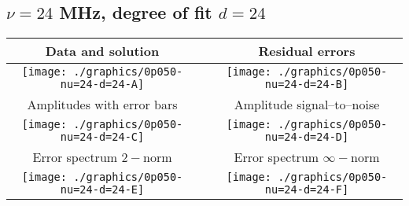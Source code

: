 

% 

\clearpage{}
\break{}

\subsection{$\nu = 24$ MHz, degree of fit $d = 24$}

\begin{table}[h]
    \begin{center}
        \begin{tabular}{ccc}
            Data and solution & \quad & Residual errors \\\hline
            \texttt{[image: ./graphics/0p050-nu=24-d=24-A]} &&
            \texttt{[image: ./graphics/0p050-nu=24-d=24-B]} \\[15pt]
            Amplitudes with error bars && Amplitude signal--to--noise \\\hline
            \texttt{[image: ./graphics/0p050-nu=24-d=24-C]} &&
            \texttt{[image: ./graphics/0p050-nu=24-d=24-D]} \\[15pt]
            Error spectrum $2-$norm && Error spectrum $\infty-$norm \\\hline
            \texttt{[image: ./graphics/0p050-nu=24-d=24-E]} &&
            \texttt{[image: ./graphics/0p050-nu=24-d=24-F]} \\[15pt]
        \end{tabular}
    \end{center}
\label{fig:elev=50, nu=24}
\end{table}



\endinput

